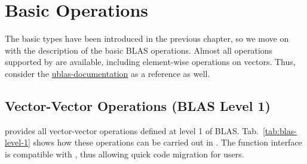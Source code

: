 \chapter{Basic Operations} \label{chap:operations}

The basic types have been introduced in the previous chapter, so we move on with the description of the basic BLAS operations.
Almost all operations supported by {\ublas} are available, including element-wise operations on vectors. Thus, consider the  
\href{http://www.boost.org/doc/libs/1_52_0/libs/numeric/ublas/doc/operations_overview.htm}{ublas-documentation} as a reference as well.

\section{Vector-Vector Operations (BLAS Level 1)}

{\ViennaCL} provides all vector-vector operations defined at level 1 of BLAS. Tab.~\ref{tab:blas-level-1} shows how these operations can be carried
out in \ViennaCL. The function interface is compatible with {\ublas},
thus allowing quick code migration for {\ublas} users.




